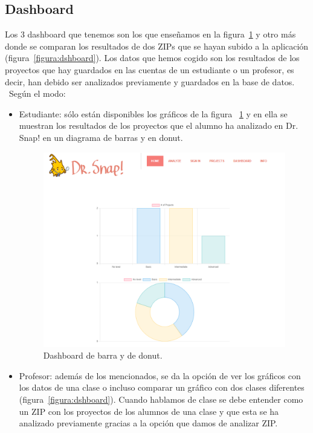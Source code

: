 \documentclass[a4paper, 12pt]{book}
\begin{document}
\subsection{Dashboard}
       Los 3 dashboard que tenemos son los que enseñamos en la figura~\ref{figura:dshboard2} y otro más donde se comparan los resultados de dos ZIPs que se hayan subido a la aplicación (figura~\ref{figura:dshboard}). Los datos que hemos cogido son los resultados de los proyectos que hay guardados en las cuentas de un estudiante o un profesor, es decir, han debido ser analizados previamente y guardados en la base de datos. ~Según el modo:
    \begin{itemize}
        \item Estudiante: sólo están disponibles los gráficos de la figura ~\ref{figura:dshboard2} y en ella se muestran los resultados de los proyectos que el alumno ha analizado en Dr. Snap! en un diagrama de barras y en donut.\\
        \begin{figure}[h]
            \centering
            \includegraphics[scale=0.4]{img/dashboard.PNG}
            \caption{Dashboard de barra y de donut.}
            \label{figura:dshboard2}
        \end{figure}
        
        \item Profesor: además de los mencionados, se da la opción de ver los gráficos con los datos de una clase o incluso comparar un gráfico con dos clases diferentes (figura~\ref{figura:dshboard}). Cuando hablamos de clase se debe entender como un ZIP con los proyectos de los alumnos de una clase y que esta se ha analizado previamente gracias a la opción que damos de analizar ZIP.
        

\end{itemize}
\end{document}
